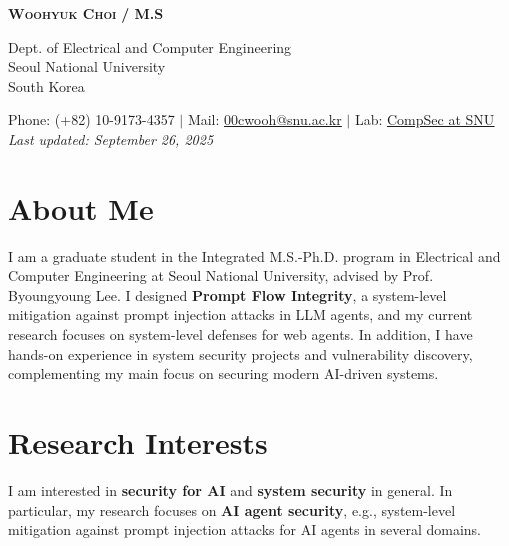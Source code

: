 \documentclass[letterpaper,11pt]{article}
\begin{document}


\begin{center}
  \textbf{\Huge \scshape Woohyuk Choi} \textbf{ /  M.S} \\ \vspace{10pt}

  Dept. of Electrical and Computer Engineering \\
  Seoul National University \\
  South Korea \\ \vspace{10pt}

  \small Phone: (+82) 10-9173-4357 $|$ Mail:
  \href{mailto:00cwooh@snu.ac.kr}{\underline{00cwooh@snu.ac.kr}} $|$
  Lab: \href{https://compsec.snu.ac.kr}{\underline{CompSec at SNU}} \\
  \vspace{5pt}
  \textit{\small Last updated: September 26, 2025}
\end{center}

\vspace{15pt}
\section{About Me} 
I am a graduate student in the Integrated M.S.-Ph.D. program in Electrical
and Computer Engineering at Seoul National University, advised by Prof.
Byoungyoung Lee.
%
I designed \textbf{Prompt Flow Integrity}, a system-level
mitigation against prompt injection attacks in LLM agents,
and my current research focuses on system-level defenses for
web agents. 
%
In addition, I have hands-on experience in system security projects and
vulnerability discovery, complementing my main focus on securing
modern AI-driven systems.

\vspace{10pt}

\section{Research Interests}

I am interested in \textbf{security for AI} and \textbf{system security}
in general.
%
In particular, my research focuses on \textbf{AI agent security}, e.g., 
system-level mitigation against prompt injection attacks for AI agents
in several domains.

\vspace{10pt}
\end{document}
